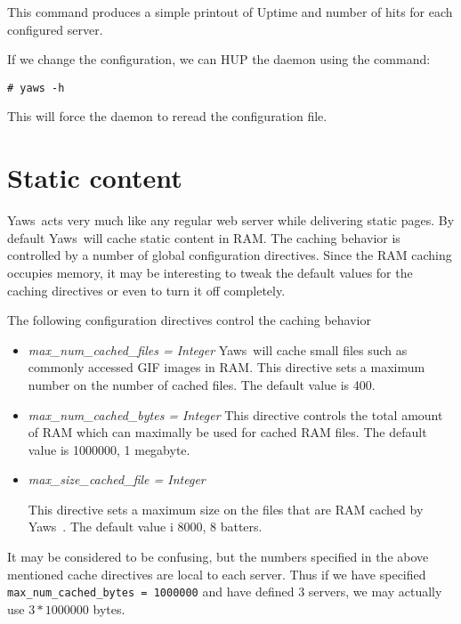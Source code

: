 \documentclass[11pt,oneside,english]{book}
\newcommand{\Yaws}            %
        {{\sc Yaws}}
\begin{document}
This command produces a simple printout of Uptime and number of hits
for each configured server.

If we change the configuration, we can HUP the daemon using the
command:
\begin{verbatim}
# yaws -h
\end{verbatim}

This will force the daemon to reread the configuration file.



\chapter{Static content}

\Yaws\  acts very much like any regular web server while delivering
static pages. By default \Yaws\  will cache static content in RAM.
The caching behavior is controlled by a number of global
configuration directives. Since the RAM caching occupies memory,
it may be interesting to tweak the default values for the caching directives
or even to turn it off completely.

The following configuration directives control the caching behavior
\begin{itemize}
\item \textit{max\_num\_cached\_files = Integer}
\Yaws\   will  cache  small  files  such  as  commonly
              accessed  GIF images in RAM.  This directive sets a
              maximum number on the number of cached files.   The
              default value is 400.

\item\textit{max\_num\_cached\_bytes = Integer}
 This  directive  controls  the  total amount of RAM
             which can maximally be used for cached  RAM  files.
              The default value is 1000000, 1 megabyte.


\item\textit{max\_size\_cached\_file = Integer}

 This  directive  sets  a  maximum size on the files
              that are RAM cached by \Yaws\ .  The default  value  i
              8000, 8 batters.



\end{itemize}

It may be considered to be confusing, but the numbers specified
in the above mentioned cache directives are local to each
server. Thus if we have specified \verb+max_num_cached_bytes = 1000000+
and have defined 3 servers, we may actually use $3 * 1000000$ bytes.
\end{document}
